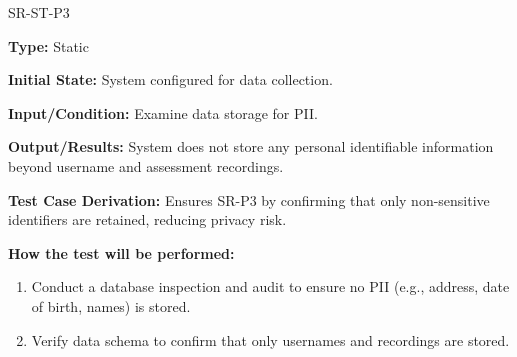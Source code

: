 \documentclass[12pt, titlepage]{article}
\begin{document}
\begin{itemize}
  \begin{item}
    SR-ST-P3
    \begin{mdframed}[linewidth=0.5mm]
      \textbf{Type:} Static \par
      \textbf{Initial State:} System configured for data collection. \par
      \textbf{Input/Condition:} Examine data storage for PII. \par
      \textbf{Output/Results:} System does not store any personal identifiable information beyond username and assessment recordings. \par
      \textbf{Test Case Derivation:} Ensures SR-P3 by confirming that only non-sensitive identifiers are retained, reducing privacy risk. \par
      \textbf{How the test will be performed:}
      \begin{enumerate}[noitemsep]
        \item Conduct a database inspection and audit to ensure no PII (e.g., address, date of birth, names) is stored.
        \item Verify data schema to confirm that only usernames and recordings are stored.
      \end{enumerate}
    \end{mdframed}
  \end{item}


\end{itemize}
\end{document}
